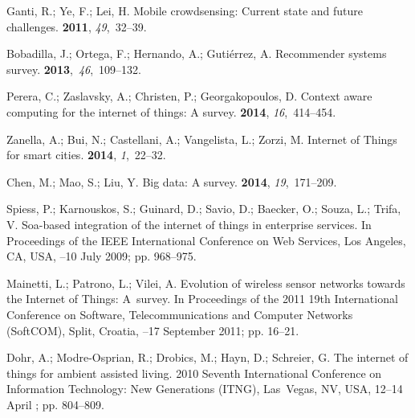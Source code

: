 \documentclass[symmetry,article,accept,moreauthors,pdftex10pt,a4paper]{mdpi}
\begin{document}
\begin{thebibliography}{999}
Ganti, R.; Ye, F.; Lei, H.
\newblock Mobile crowdsensing: Current state and future challenges.
 {\bf 2011}, {\em 49},~32--39.

Bobadilla, J.; Ortega, F.; Hernando, A.; Gutiérrez, A.
\newblock Recommender systems survey.
 {\bf 2013},~{\em 46},~109--132.

Perera, C.; Zaslavsky, A.; Christen, P.; Georgakopoulos, D.
\newblock Context aware computing for the internet of things: A survey.
 {\bf 2014}, {\em
	16},~414--454.

Zanella, A.; Bui, N.; Castellani, A.; Vangelista, L.; Zorzi, M.
\newblock Internet of Things for smart cities.
 {\bf 2014}, {\em 1},~22--32.

Chen, M.; Mao, S.; Liu, Y.
\newblock Big data: A survey.
 {\bf 2014}, {\em
	19},~171--209.

Spiess, P.; Karnouskos, S.; Guinard, D.; Savio, D.; Baecker, O.; Souza, L.;
Trifa, V.
\newblock Soa-based integration of the internet of things in enterprise
services. In Proceedings of the IEEE International Conference on Web Services, Los Angeles, CA, USA,
--10 July 2009; pp. 968--975.

Mainetti, L.; Patrono, L.; Vilei, A.
\newblock Evolution of wireless sensor networks towards the Internet of Things:
A~survey. In Proceedings of the 2011 19th International Conference on Software, Telecommunications and Computer Networks (SoftCOM), Split, Croatia,
--17 September 2011; pp. 16--21.

Dohr, A.; Modre-Osprian, R.; Drobics, M.; Hayn, D.; Schreier, G.
\newblock The internet of things for ambient assisted living. 2010 Seventh International Conference on Information Technology: New Generations (ITNG), Las~Vegas, NV, USA, 12--14 April 
; pp. 804--809.


\end{thebibliography}
\end{document}
